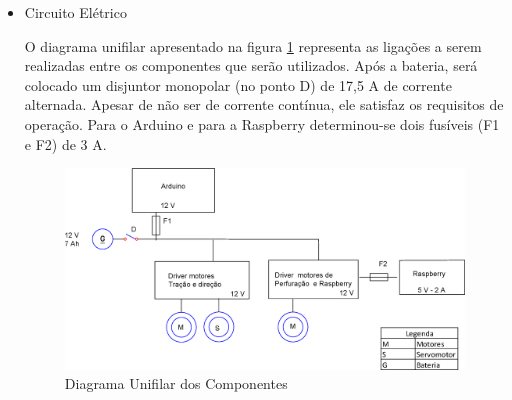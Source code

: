 \begin{itemize}
   Um ponto importante é observar que como os motores estarão conectados aos seus respectivos drivers de controle as correntes máximas são limitadas por eles. Como serão dois drivers de controle, a corrente máxima necessária será de 10 A - dois drivers mais a corrente do Arduino. Portanto, para 1 hora de operação em carga máxima, será necessário uma bateria de 10Ah. Tendo em vista que durante a operação do veículo, não haverá a utilização de todos os componentes em carga máxima ao mesmo tempo, a autonomia do veículo poderá vir a ser maior que o tempo estimado.
   
   Optou-se pelo modelo Get Power gp12-14, ela possui 12V e 7Ah. Para recarregar a bateria foi cogitado a utilização de um painel solar. Porém, a placa solar possui dimensões maiores que a estrutura do carro e um baixo ganho energético, em torno de apenas 3\%, o que não viabiliza a sua aplicação nesse projeto.
   

     \item Circuito Elétrico

     O diagrama unifilar apresentado na figura \ref{diagramaunifilar} representa as ligações a serem realizadas entre os componentes que serão utilizados.
     Após a bateria, será colocado um disjuntor monopolar (no ponto D) de 17,5 A de corrente alternada. Apesar de não ser de
     corrente contínua, ele satisfaz os requisitos de operação. Para o Arduino e para a Raspberry determinou-se dois fusíveis
     (F1 e F2) de 3 A.

     \begin{figure}[!htbp]
     \begin{center}
     \includegraphics[keepaspectratio=true,scale=0.5]{figuras/diagramaunifilar.eps}
     \caption{\label{diagramaunifilar}Diagrama Unifilar dos Componentes}
     \end{center}
     \end{figure}

  \end{itemize}
